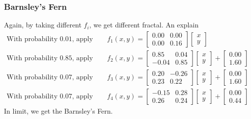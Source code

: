 \subsubsection{Barnsley's Fern}{\label{pp:barnsleyfern}}
Again, by taking different $f_i$, we get different fractal. An explain
\begin{align}
	\text{With probability 0.01, apply }& \quad f_{1}(x,y) = {\begin{bmatrix}0.00&0.00\\0.00&0.16\end{bmatrix}}{\begin{bmatrix}x\\y\end{bmatrix}}\\
	\text{With probability 0.85, apply }& \quad f_{2}(x,y) = {\begin{bmatrix}0.85&0.04\\-0.04&0.85\end{bmatrix}}{\begin{bmatrix}x\\y\end{bmatrix}}+{\begin{bmatrix}0.00\\1.60\end{bmatrix}}\\
	\text{With probability 0.07, apply }& \quad f_{3}(x,y) = {\begin{bmatrix}0.20&-0.26\\0.23&0.22\end{bmatrix}}{\begin{bmatrix}x\\y\end{bmatrix}}+{\begin{bmatrix}0.00\\1.60\end{bmatrix}}\\
	\text{With probability 0.07, apply }& \quad f_{4}(x,y) = {\begin{bmatrix}-0.15&0.28\\0.26&0.24\end{bmatrix}}{\begin{bmatrix}x\\y\end{bmatrix}}+{\begin{bmatrix}0.00\\0.44\end{bmatrix}}
\end{align}
In limit, we get the Barnsley's Fern.

